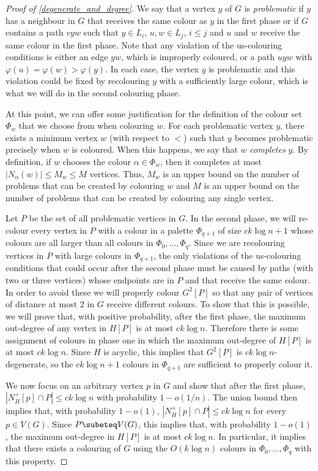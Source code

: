 \documentclass{patmorin}
\newcommand{\defin}[1]{\emph{\color{brightmaroon}#1}}
\begin{document}
\begin{proof}[Proof of \cref{degenerate_and_degree}]
  We say that a vertex $y$ of $G$ is \defin{problematic} if $y$ has a neighbour in $G$ that receives the same colour as $y$ in the first phase or if $G$ contains a path $vyw$ such that $y\in L_i$, $u,w\in L_j$, $i \le j$ and $u$ and $w$ receive the same colour in the first phase. Note that any violation of the us-colouring conditions is either an edge $yw$, which is improperly coloured, or a path $uyw$ with $\varphi(u)=\varphi(w)>\varphi(y)$.  In each case, the vertex $y$ is problematic and this violation could be fixed by recolouring $y$ with a sufficiently large colour, which is what we will do in the second colouring phase.

  At this point, we can offer some justification for the definition of the colour set $\Phi_w$ that we choose from when colouring $w$. For each problematic vertex $y$, there exists a minimum vertex $w$ (with respect to $<$) such that $y$ becomes problematic precisely when $w$ is coloured.  When this happens, we say that $w$ \defin{completes} $y$. By definition, if $w$ chooses the colour $\alpha\in\Phi_w$, then it completes at most $|N_{\alpha}(w)|\le M_w\le M$ vertices. Thus, $M_w$ is an upper bound on the number of problems that can be created by colouring $w$ and $M$ is an upper bound on the number of problems that can be created by colouring any single vertex.

  Let $P$ be the set of all problematic vertices in $G$.  In the second phase, we will re-colour every vertex in $P$ with a colour in a palette $\Phi_{q+1}$ of size $ck\log n + 1$ whose colours are all larger than all colours in $\Phi_0,\ldots,\Phi_q$.  Since we are recolouring vertices in $P$ with large colours in $\Phi_{q+1}$, the only violations of the us-colouring conditions that could occur after the second phase must be caused by paths (with two or three vertices) whose endpoints are in $P$ and that receive the same colour.  In order to avoid these we will properly colour $G^2[P]$ so that any pair of vertices of distance at most $2$ in $G$ receive different colours.  To show that this is possible, we will prove that, with positive probability, after the first phase, the maximum out-degree of any vertex in $H[P]$ is at most $ck\log n$.  Therefore there is some assignment of colours in phase one in which the maximum out-degree of $H[P]$ is at most $ck\log n$.  Since $H$ is acyclic, this implies that $G^2[P]$ is $ck\log n$-degenerate, so the $ck\log n + 1$ colours in $\Phi_{q+1}$ are sufficient to properly colour it.

  We now focus on an arbitrary vertex $p$ in $G$ and show that after the first phase, $|N^+_{H}[p]\cap P|\le ck\log n$ with probability $1-o(1/n)$.  The union bound then implies that, with probability $1-o(1)$, $|N^+_{H}[p]\cap P|\le ck\log n$ for every $p\in V(G)$.  Since $P\subeteq V(G)$, this implies that, with probability $1-o(1)$, the maximum out-degree in $H[P]$ is at most $ck\log n$.  In particular, it implies that there exists a colouring of $G$ using the $O(k\log n)$ colours in $\Phi_0,\ldots,\Phi_q$ with this property.


\end{proof}
\end{document}
